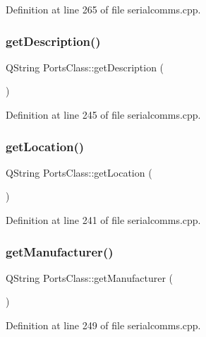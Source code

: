 Definition at line 265 of file serialcomms.\+cpp.

\mbox{\label{class_ports_class_aabad7eb750a333dc8e8facb741dd62fa}} 
\subsubsection{\texorpdfstring{getDescription()}{getDescription()}}
{\footnotesize\ttfamily Q\+String Ports\+Class\+::get\+Description (\begin{DoxyParamCaption}{ }\end{DoxyParamCaption})}



Definition at line 245 of file serialcomms.\+cpp.

\mbox{\label{class_ports_class_a2dea26b21dbd7545b9852d8086ce4657}} 
\subsubsection{\texorpdfstring{getLocation()}{getLocation()}}
{\footnotesize\ttfamily Q\+String Ports\+Class\+::get\+Location (\begin{DoxyParamCaption}{ }\end{DoxyParamCaption})}



Definition at line 241 of file serialcomms.\+cpp.

\mbox{\label{class_ports_class_a8a0b3c6b43b97f7a2519942b51cf8db6}} 
\subsubsection{\texorpdfstring{getManufacturer()}{getManufacturer()}}
{\footnotesize\ttfamily Q\+String Ports\+Class\+::get\+Manufacturer (\begin{DoxyParamCaption}{ }\end{DoxyParamCaption})}



Definition at line 249 of file serialcomms.\+cpp.


